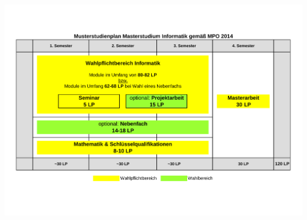 
\begin{center}
	\includegraphics[width=\textwidth,trim={1cm 3.5cm 1cm 3.45cm},clip]{bilder/studienplan_msc/Musterstudienplan_MSc.pdf}
\end{center}

